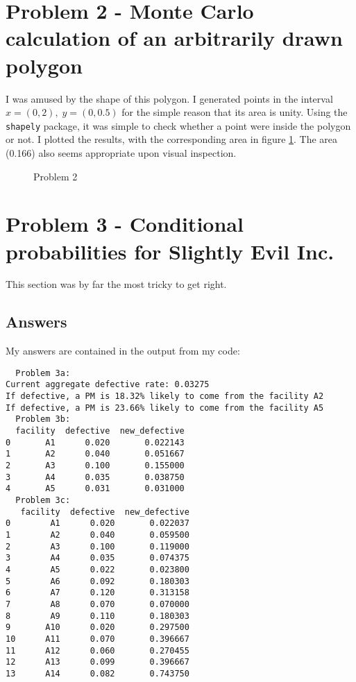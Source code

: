\documentclass[a4paper,11pt]{article}
\begin{document}
\begin{titlepage}
  \centering
  \begin{figure}[H]
  \end{figure}
\end{titlepage}


\section{Problem 2 - Monte Carlo calculation of an arbitrarily drawn polygon}
I was amused by the shape of this polygon.
I generated points in the interval $x = (0,2), \; y = (0, 0.5)$ for the simple reason that its area is unity.
Using the \texttt{shapely} package, it was simple to check whether a point were inside the polygon or not.
I plotted the results, with the corresponding area in figure \ref{p2_bat}.
The area (0.166) also seems appropriate upon visual inspection.

\begin{figure}
  \caption{Problem 2}
  \label{p2_bat}
\end{figure}


\section{Problem 3 - Conditional probabilities for Slightly Evil Inc.}

This section was by far the most tricky to get right.
\subsection{Answers}
My answers are contained in the output from my code:
\begin{verbatim}
  Problem 3a:
Current aggregate defective rate: 0.03275
If defective, a PM is 18.32% likely to come from the facility A2
If defective, a PM is 23.66% likely to come from the facility A5
  Problem 3b:
  facility  defective  new_defective
0       A1      0.020       0.022143
1       A2      0.040       0.051667
2       A3      0.100       0.155000
3       A4      0.035       0.038750
4       A5      0.031       0.031000
  Problem 3c:
   facility  defective  new_defective
0        A1      0.020       0.022037
1        A2      0.040       0.059500
2        A3      0.100       0.119000
3        A4      0.035       0.074375
4        A5      0.022       0.023800
5        A6      0.092       0.180303
6        A7      0.120       0.313158
7        A8      0.070       0.070000
8        A9      0.110       0.180303
9       A10      0.020       0.297500
10      A11      0.070       0.396667
11      A12      0.060       0.270455
12      A13      0.099       0.396667
13      A14      0.082       0.743750
\end{verbatim}
\end{document}
